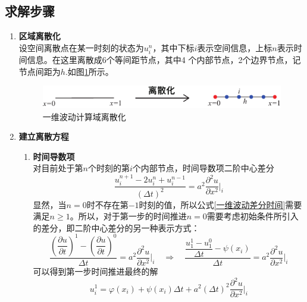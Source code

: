 \subsection{求解步骤}
\begin{enumerate}[\textbf{步骤} 1 ]
	\item \textbf{区域离散化}\\
	设空间离散点在某一时刻的状态为$u_i^n$，其中下标$i$表示空间信息，上标$n$表示时间信息。在这里离散成6个等间距节点，其中4 个内部节点，2个边界节点，记节点间距为$h$.如图\ref{一维差分波动}所示。
	\begin{figure}[!htb]
		\centering
		\includegraphics[width=0.6\linewidth]{pic/一维差分传热.pdf}
		\caption{一维波动计算域离散化}
		\label{一维差分波动}
	\end{figure}
	
	\item \textbf{建立离散方程}
	\begin{enumerate}[(1) ]
		\item \textbf{时间导数项}\\
		\hspace*{1em} 对目前处于第$n$个时刻的第$i$个内部节点，时间导数项二阶中心差分
		\begin{equation}
			\dfrac{u_i^{n+1}-2u_i^n+u_i^{n-1}}{(\Delta t)^2} = a^2 \dfrac{\partial^2 u}{\partial x^2}\Bigg|_i
			\label{一维波动差分时间}
		\end{equation}
		显然，当$n=0$时不存在第$-1$时刻的值，所以公式\eqref{一维波动差分时间}需要满足$n \ge 1$。所以，对于第一步的时间推进$n = 0$需要考虑初始条件所引入的差分，即二阶中心差分的另一种表示方式：
		\begin{equation}
			\dfrac{\left(\dfrac{\partial u}{\partial t}\right)^1 - \left(\dfrac{\partial u}{\partial t}\right)^0}{\Delta t} = a^2 \dfrac{\partial^2 u}{\partial x^2}\Bigg|_i 
			\quad \Rightarrow \quad
			\dfrac{\dfrac{u_1^1-u_1^0}{\Delta t} - \psi(x_i)}{\Delta t}= a^2 \dfrac{\partial^2 u}{\partial x^2}\Bigg|_i 
		\end{equation}
		可以得到第一步时间推进最终的解
		\begin{equation}
			u_i^1=\varphi(x_i)+\psi(x_i)\Delta t + a^2 (\Delta t)^2\dfrac{\partial^2 u}{\partial x^2}\Bigg|_i
		\end{equation}
		\clearpage
		

\end{enumerate}
\end{enumerate}
